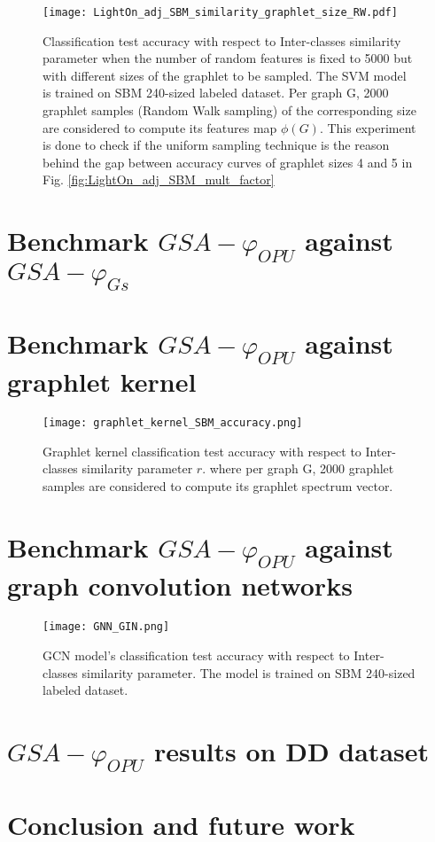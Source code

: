 \begin{figure}[H]
\centering
\texttt{[image: LightOn\_adj\_SBM\_similarity\_graphlet\_size\_RW.pdf]}
\caption[Classification test accuracy as a function of Inter-classes similarity parameter ]{Classification test accuracy with respect to Inter-classes similarity parameter when the number of random features is fixed to 5000 but with different sizes of the graphlet to be sampled. The SVM model is trained on SBM 240-sized labeled dataset. Per graph G, 2000 graphlet samples (Random Walk sampling) of the corresponding size are considered to compute its features map $\phi(G)$. This experiment is done to check if the uniform sampling technique is the reason behind the gap between accuracy curves of graphlet sizes 4 and 5 in Fig. \ref{fig:LightOn_adj_SBM_mult_factor} }
\label{fig:LightOn_adj_SBM_multfactor_RW}
\end{figure}

\section{Benchmark $GSA-\varphi_{OPU}$ against $GSA-\varphi_{Gs}$}

\section{Benchmark $GSA-\varphi_{OPU}$ against graphlet kernel}
\begin{figure}[H]
\centering
\texttt{[image: graphlet\_kernel\_SBM\_accuracy.png]}
\caption[Graphlet kernel classification test accuracy as a function of Inter-classes similarity parameter]{Graphlet kernel classification test accuracy with respect to Inter-classes similarity parameter $r$. where per graph G, 2000 graphlet samples are considered to compute its graphlet spectrum vector. }
\label{fig:graphlet_kernel_SBM}
\end{figure}

\section{Benchmark $GSA-\varphi_{OPU}$ against graph convolution networks}
\begin{figure}[H]
\centering
\texttt{[image: GNN\_GIN.png]}
\caption[GCN model's classification test accuracy as a function of Inter-classes similarity parameter ]{GCN model's classification test accuracy with respect to Inter-classes similarity parameter. The  model is trained on SBM 240-sized labeled dataset.}
\label{fig:GCN_GIN_SBM_multfactor_RW}
\end{figure}

\section{$GSA-\varphi_{OPU}$ results on DD dataset}
\section{Conclusion and future work}





